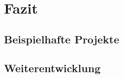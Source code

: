 \section{Fazit}

\subsection{Beispielhafte Projekte}
\label{sec:example-projects}

\subsection{Weiterentwicklung}



